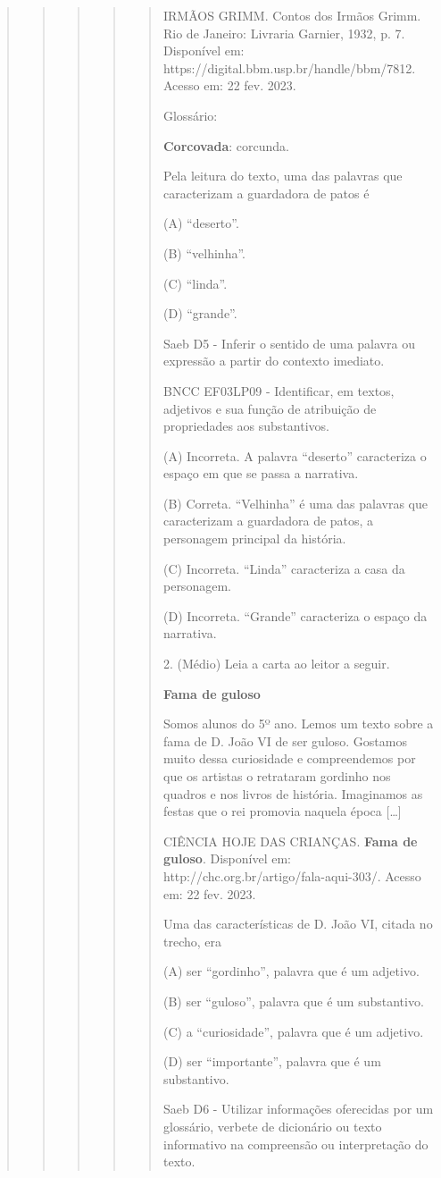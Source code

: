 \begin{quote}
\begin{quote}
\begin{quote}
\begin{quote}
\begin{quote}
IRMÃOS GRIMM. Contos dos Irmãos Grimm. Rio de Janeiro: Livraria Garnier,
1932, p. 7. Disponível em: https://digital.bbm.usp.br/handle/bbm/7812.
Acesso em: 22 fev. 2023.

Glossário:

\textbf{Corcovada}: corcunda.

Pela leitura do texto, uma das palavras que caracterizam a guardadora de
patos é

(A) ``deserto''.

(B) ``velhinha''.

(C) ``linda''.

(D) ``grande''.

Saeb D5 - Inferir o sentido de uma palavra ou expressão a partir do
contexto imediato.

BNCC EF03LP09 - Identificar, em textos, adjetivos e sua função de
atribuição de propriedades aos substantivos.

(A) Incorreta. A palavra ``deserto'' caracteriza o espaço em que se
passa a narrativa.

(B) Correta. ``Velhinha'' é uma das palavras que caracterizam a
guardadora de patos, a personagem principal da história.

(C) Incorreta. ``Linda'' caracteriza a casa da personagem.

(D) Incorreta. ``Grande'' caracteriza o espaço da narrativa.

2. (Médio) Leia a carta ao leitor a seguir.

\textbf{Fama de guloso}

Somos alunos do 5º ano. Lemos um texto sobre a fama de D. João VI de ser
guloso. Gostamos muito dessa curiosidade e compreendemos por que os
artistas o retrataram gordinho nos quadros e nos livros de história.
Imaginamos as festas que o rei promovia naquela época {[}\ldots{}{]}

CIÊNCIA HOJE DAS CRIANÇAS. \textbf{Fama de guloso}. Disponível em:
http://chc.org.br/artigo/fala-aqui-303/. Acesso em: 22 fev. 2023.

Uma das características de D. João VI, citada no trecho, era

(A) ser ``gordinho'', palavra que é um adjetivo.

(B) ser ``guloso'', palavra que é um substantivo.

(C) a ``curiosidade'', palavra que é um adjetivo.

(D) ser ``importante'', palavra que é um substantivo.

Saeb D6 - Utilizar informações oferecidas por um glossário, verbete de
dicionário ou texto informativo na compreensão ou interpretação do
texto.


\end{quote}
\end{quote}
\end{quote}
\end{quote}
\end{quote}
